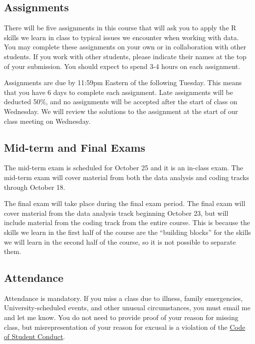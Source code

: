 \documentclass[12pt,letterpaper]{article}
\begin{document}
\subsection*{Assignments}

There will be five assignments in this course that will ask you to apply the R skills we learn in class to typical issues we encounter when working with data. You may complete these assignments on your own or in collaboration with other students. If you work with other students, please indicate their names at the top of your submission. You should expect to spend 3-4 hours on each assignment. \par

Assignments are due by 11:59pm Eastern of the following Tuesday. This means that you have 6 days to complete each assignment. Late assignments will be deducted 50\%, and no assignments will be accepted after the start of class on Wednesday. We will review the solutions to the assignment at the start of our class meeting on Wednesday. \par

\subsection*{Mid-term and Final Exams}

The mid-term exam is scheduled for October 25 and it is an in-class exam. The mid-term exam will cover material from both the data analysis and coding tracks through October 18.  \par

The final exam will take place during the final exam period. The final exam will cover material from the data analysis track beginning October 23, but will include material from the coding track from the entire course. This is because the skills we learn in the first half of the course are the ``building blocks'' for the skills we will learn in the second half of the course, so it is not possible to separate them.

\subsection*{Attendance}

Attendance is mandatory. If you miss a class due to illness, family emergencies, University-scheduled events, and other unusual circumstances, you must email me and let me know. You do not need to provide proof of your reason for missing class, but misrepresentation of your reason for excusal is a violation of the \href{https://studentconduct.gwu.edu/code-student-conduct}{Code of Student Conduct}. \par
\end{document}

